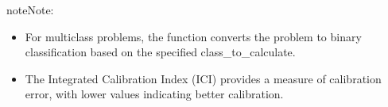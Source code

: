 \documentclass[letterpaper,10pt,english]{sphinxmanual}
\begin{document}
\begin{fulllineitems}
\begin{sphinxadmonition}{note}{Note:}
\begin{itemize}
\item {} 
\sphinxAtStartPar
For multi\sphinxhyphen{}class problems, the function converts the problem to binary classification
based on the specified class\_to\_calculate.

\item {} 
\sphinxAtStartPar
The Integrated Calibration Index (ICI) provides a measure of calibration error,
with lower values indicating better calibration.

\end{itemize}
\end{sphinxadmonition}

\end{fulllineitems}

\end{document}
